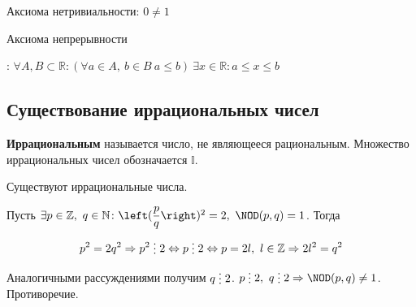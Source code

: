 Аксиома нетривиальности: $0 \neq 1$

\hypertarget{eq:continuity_axiom}{Аксиома непрерывности}: $\forall A, B \subset \mathbb R \colon
(\forall a \in A, \ b \in B \ a \leqslant b) \
\exists x \in \mathbb R \colon
a \leqslant x \leqslant b$

\subsection{Существование иррациональных чисел}
  \textbf{Иррациональным} называется число, не являющееся рациональным.
Множество иррациональных чисел обозначается $\mathbb I$.

\begin{statement}
Существуют иррациональные числа.
\end{statement}
\begin{proofcontra}
Пусть $\exists p \in \mathbb Z, \ q \in \mathbb N \colon
\left( \dfrac{p}q \right)^2 = 2, \ \NOD(p, q) = 1$.
Тогда
\begin{equation*}
p^2 = 2q^2 \Rightarrow p^2 \mult 2 \Leftrightarrow p \mult 2
\Leftrightarrow p = 2l, \ l \in \mathbb Z \Rightarrow 2l^2 = q^2
\end{equation*}

Аналогичными рассуждениями получим $q \mult 2$.
$p \mult 2, \ q \mult 2 \Rightarrow \NOD(p, q) \neq 1$.
Противоречие.
\end{proofcontra}

